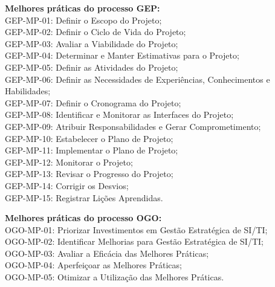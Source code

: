 \textbf{Melhores práticas do processo GEP: }
\\GEP-MP-01: Definir o Escopo do Projeto;
\\GEP-MP-02: Definir o Ciclo de Vida do Projeto;
\\GEP-MP-03: Avaliar a Viabilidade do Projeto;
\\GEP-MP-04: Determinar e Manter Estimativas para o Projeto;
\\GEP-MP-05: Definir as Atividades do Projeto;
\\GEP-MP-06: Definir as Necessidades de Experiências, Conhecimentos e Habilidades;
\\GEP-MP-07: Definir o Cronograma do Projeto;
\\GEP-MP-08: Identificar e Monitorar as Interfaces do Projeto;
\\GEP-MP-09: Atribuir Responsabilidades e Gerar Comprometimento;
\\GEP-MP-10: Estabelecer o Plano de Projeto;
\\GEP-MP-11: Implementar o Plano de Projeto;
\\GEP-MP-12: Monitorar o Projeto;
\\GEP-MP-13: Revisar o Progresso do Projeto;
\\GEP-MP-14: Corrigir os Desvios;
\\GEP-MP-15: Registrar Lições Aprendidas.

\textbf{Melhores práticas do processo OGO: }
\\OGO-MP-01: Priorizar Investimentos em Gestão Estratégica de SI/TI;
\\OGO-MP-02: Identificar Melhorias para Gestão Estratégica de SI/TI;
\\OGO-MP-03: Avaliar a Eficácia das Melhores Práticas;
\\OGO-MP-04: Aperfeiçoar as Melhores Práticas;
\\OGO-MP-05: Otimizar a Utilização das Melhores Práticas.


%
%

